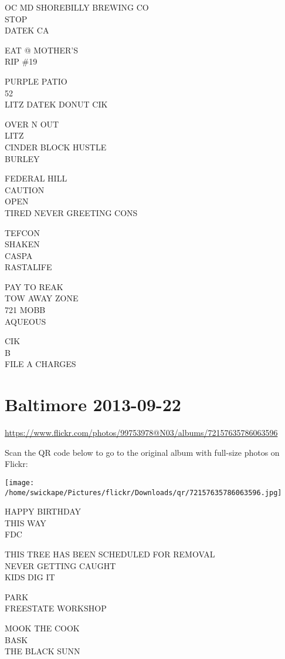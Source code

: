 \documentclass[10pt,letterpaper]{article}
\begin{document}
OC MD SHOREBILLY BREWING CO\\
STOP\\
DATEK CA

EAT @ MOTHER'S\\
RIP \#19

PURPLE PATIO\\
52\\
LITZ DATEK DONUT CIK

OVER N OUT\\
LITZ\\
CINDER BLOCK HUSTLE\\
BURLEY

FEDERAL HILL\\
CAUTION\\
OPEN\\
TIRED NEVER GREETING CONS

TEFCON\\
SHAKEN\\
CASPA\\
RASTALIFE

PAY TO REAK\\
TOW AWAY ZONE\\
721 MOBB\\
AQUEOUS

CIK\\
B\\
FILE A CHARGES
\pagebreak

\section*{Baltimore 2013-09-22}

\url{https://www.flickr.com/photos/99753978@N03/albums/72157635786063596}

Scan the QR code below to go to the original album with full-size photos on Flickr:

\texttt{[image: /home/swickape/Pictures/flickr/Downloads/qr/72157635786063596.jpg]}
\pagebreak

HAPPY BIRTHDAY\\
THIS WAY\\
FDC

THIS TREE HAS BEEN SCHEDULED FOR REMOVAL\\
NEVER GETTING CAUGHT\\
KIDS DIG IT

PARK\\
FREESTATE WORKSHOP

MOOK THE COOK\\
BASK\\
THE BLACK SUNN
\end{document}
